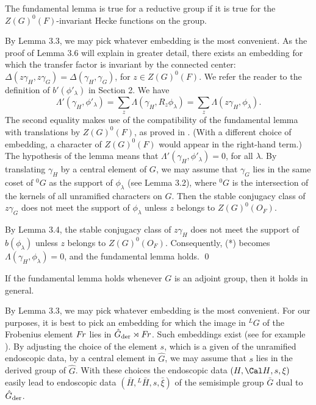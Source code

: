   The fundamental lemma is true for a reductive
group if it is true for the $Z(G)^0(F)$-invariant Hecke functions
on the group.
\endproclaim

By Lemma 3.3, we may pick whatever embedding is the most
convenient.  As the proof of Lemma 3.6 will explain in
greater detail, there exists an embedding for which
the transfer factor is invariant by the connected center:
$\Delta(z\gamma_H,z\gamma_G) = \Delta(\gamma_H,\gamma_G)$, for
$z\in Z(G)^0(F)$.
We refer the reader to the definition
of $b'(\phi'_\lambda)$ in Section 2.
We have
$$
\Lambda'(\gamma_H,\phi'_\lambda) = \sum_z \Lambda(\gamma_H,R_z\phi_\lambda) =
\sum_z \Lambda(z\gamma_H,\phi_\lambda).\tag{*}$$
The second equality makes use of the compatibility of the
fundamental lemma with translations by $Z(G)^0(F)$, as proved in
\cite{H2,11}.  (With a different choice of embedding, a character
of $Z(G)^0(F)$ would appear in the right-hand term.)
The hypothesis of the lemma means that $\Lambda'(\gamma_H,\phi'_\lambda)=0$,
for all $\lambda$.  By translating $\gamma_H$ by a central element
of $G$, 
we may assume that
$\gamma_G$ lies in the same coset of ${}^0\!G$ as the support of $\phi_\lambda$
(see Lemma 3.2),
where ${}^0\!G$ is the intersection of the kernels 
of all unramified characters on $G$.  
Then the stable
conjugacy class of $z\gamma_G$ does not meet the support of $\phi_\lambda$
unless $z$ belongs to $Z(G)^0(O_F)$.

By Lemma 3.4, the stable conjugacy class of $z\gamma_H$ 
does not meet the support of $b(\phi_\lambda)$
unless $z$ belongs to $Z(G)^0(O_F)$.  Consequently,
(*) becomes $\Lambda(\gamma_H,\phi_\lambda)=0$, and the fundamental
lemma holds.
\qed
\enddemo


  If the fundamental lemma holds
whenever $G$ is an adjoint group, then it holds in
general.  \endproclaim

By Lemma 3.3, we may pick whatever embedding is the most
convenient.  For our purposes, it is best to pick an embedding
for which the image in ${}^L\!G$ of the Frobenius element $\text{$F\hskip-.1em r$}$
lies in $\hat G_{\text{der}}\rtimes\text{$F\hskip-.1em r$}$.  Such embeddings
exist (see for example \cite{H2,6.1}).  By adjusting the
choice of the element $s$, which is
a given of the unramified endoscopic data, 
by a central element in $\hat G$,
we may assume that $s$ lies in the derived group of $\hat G$.
With these choices the endoscopic data $(H,{\Cal H},s,\xi)$ easily
lead to endoscopic data $(\bar H,{}^L\!\bar H,s,\bar\xi)$
of the semisimple group $\bar G$ dual to $\hat G_{\text{der}}$.

